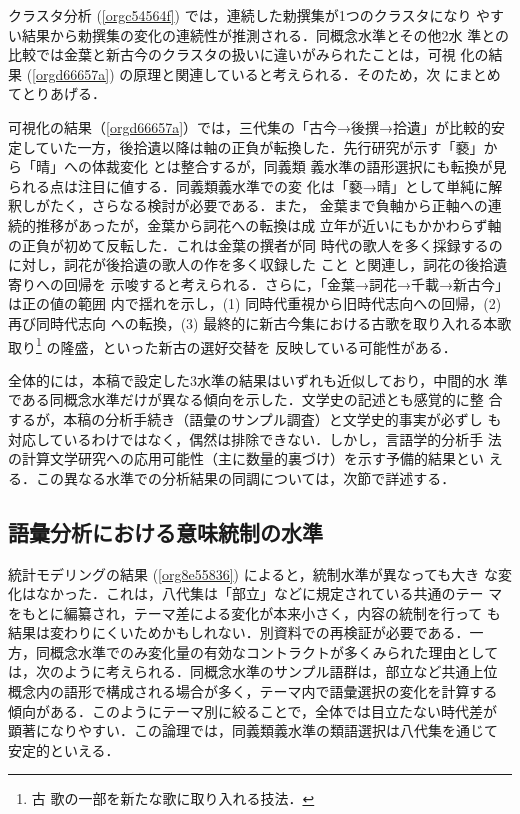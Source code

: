 \documentclass[submit]{ipsj}
\renewcommand{\ref}{\cref}
\begin{document}
クラスタ分析 (\ref{orgc54564f}) では，連続した勅撰集が1つのクラスタになり
やすい結果から勅撰集の変化の連続性が推測される．同概念水準とその他2水
準との比較では金葉と新古今のクラスタの扱いに違いがみられたことは，可視
化の結果 (\ref{orgd66657a}) の原理と関連していると考えられる．そのため，次
にまとめてとりあげる．

可視化の結果（\ref{orgd66657a}）では，三代集の「古今→後撰→拾遺」が比較的安
定していた一方，後拾遺以降は軸の正負が転換した．先行研究が示す「褻」か
ら「晴」への体裁変化 \cite{ueno1976Koshui} とは整合するが，同義類
義水準の語形選択にも転換が見られる点は注目に値する．同義類義水準での変
化は「褻→晴」として単純に解釈しがたく，さらなる検討が必要である．また，
金葉まで負軸から正軸への連続的推移があったが，金葉から詞花への転換は成
立年が近いにもかかわらず軸の正負が初めて反転した．これは金葉の撰者が同
時代の歌人を多く採録するのに対し，詞花が後拾遺の歌人の作を多く収録した
こと \cite{matsuda1939Shika} と関連し，詞花の後拾遺寄りへの回帰を
示唆すると考えられる．さらに，「金葉→詞花→千載→新古今」は正の値の範囲
内で揺れを示し，(1) 同時代重視から旧時代志向への回帰，(2) 再び同時代志向
への転換，(3) 最終的に新古今集における古歌を取り入れる本歌取り\footnote{古
歌の一部を新たな歌に取り入れる技法．} の隆盛，といった新古の選好交替を
反映している可能性がある．

全体的には，本稿で設定した3水準の結果はいずれも近似しており，中間的水
準である同概念水準だけが異なる傾向を示した．文学史の記述とも感覚的に整
合するが，本稿の分析手続き（語彙のサンプル調査）と文学史的事実が必ずし
も対応しているわけではなく，偶然は排除できない．しかし，言語学的分析手
法の計算文学研究への応用可能性（主に数量的裏づけ）を示す予備的結果とい
える．この異なる水準での分析結果の同調については，次節で詳述する．
\subsection{語彙分析における意味統制の水準\label{org0948d9c}}
\label{sec:org775b81e}
統計モデリングの結果 (\ref{org8e55836}) によると，統制水準が異なっても大き
な変化はなかった．これは，八代集は「部立」などに規定されている共通のテー
マをもとに編纂され，テーマ差による変化が本来小さく，内容の統制を行って
も結果は変わりにくいためかもしれない．別資料での再検証が必要である．一
方，同概念水準でのみ変化量の有効なコントラクトが多くみられた理由として
は，次のように考えられる．同概念水準のサンプル語群は，部立など共通上位
概念内の語形で構成される場合が多く，テーマ内で語彙選択の変化を計算する
傾向がある．このようにテーマ別に絞ることで，全体では目立たない時代差が
顕著になりやすい．この論理では，同義類義水準の類語選択は八代集を通じて
安定的といえる．
\end{document}
